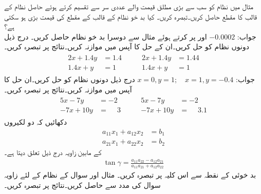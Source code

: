 
\quad
مثال  میں نظام کو سب سے بڑی مطلق قیمت والے عددی سر سے تقسیم کرتے ہوئے حاصل نظام کے قالب کا مقطع حاصل کریں۔تبصرہ کریں۔ کیا بد خو نظام کے قالب کے مقطع کی قیمت بڑی ہو سکتی ہے؟\\
جواب:\quad
$-0.0002$
\quad
{} اور  پر کرتے ہوئے مثال  سے دوسرا بد خو نظام حاصل کریں۔ 
\quad
درج ذیل دونوں نظام کو حل کریں۔ان کے حل کا آپس میں موازنہ کریں۔نتائج پر تبصرہ کریں۔
\begin{gather*}
\begin{aligned}
2x+1.4y&=1.4\\
1.4x+y&=1
\end{aligned}\quad\quad
\begin{aligned}
2x+1.4y&=1.44\\
1.4x+y&=1
\end{aligned}
\end{gather*}
جواب:\quad
$x=0,y=1;\quad x=1,y=-0.4$
\quad
درج ذیل دونوں نظام کو حل کریں۔ان حل کا آپس میں موازنہ کریں۔نتائج پر تبصرہ کریں۔
\begin{gather*}
\begin{aligned}
5x-7y&=-2\\
-7x+10y&=\phantom{-}3
\end{aligned}\quad\quad
\begin{aligned}
5x-7y&=-2\\
-7x+10y&=\phantom{-}3.1
\end{aligned}
\end{gather*}
\quad
دکھائیں کہ دو لکیروں
\begin{align*}
a_{11}x_1+a_{12}x_2&=b_1\\
a_{21}x_1+a_{22}x_2&=b_2
\end{align*}
کے مابین زاویہ  درج ذیل تعلق دیتا ہے۔
\begin{align*}
\tan \gamma=\frac{a_{11}a_{22}-a_{12}a_{21}}{a_{11}a_{21}+a_{12}a_{22}}
\end{align*}
بد خوئی کے نقطہ سے اس کلیہ پر تبصرہ کریں۔
\quad
مثال  اور سوال  کے نظام کے لئے زاویہ  سوال  کی مدد سے حاصل کریں۔نتائج پر تبصرہ کریں۔
